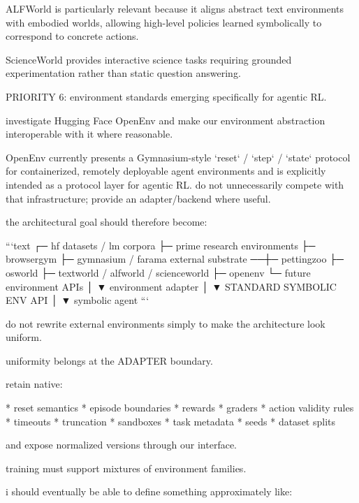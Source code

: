 ALFWorld is particularly relevant because it aligns abstract text environments with embodied worlds, allowing high-level policies learned symbolically to correspond to concrete actions.

ScienceWorld provides interactive science tasks requiring grounded experimentation rather than static question answering.

PRIORITY 6: environment standards emerging specifically for agentic RL.

investigate Hugging Face OpenEnv and make our environment abstraction interoperable with it where reasonable.

OpenEnv currently presents a Gymnasium-style `reset` / `step` / `state` protocol for containerized, remotely deployable agent environments and is explicitly intended as a protocol layer for agentic RL. do not unnecessarily compete with that infrastructure; provide an adapter/backend where useful.

the architectural goal should therefore become:

```text
                     ┌─ hf datasets / lm corpora
                     ├─ prime research environments
                     ├─ browsergym
                     ├─ gymnasium / farama
external substrate ──┼─ pettingzoo
                     ├─ osworld
                     ├─ textworld / alfworld / scienceworld
                     ├─ openenv
                     └─ future environment APIs
                              │
                              ▼
                    environment adapter
                              │
                              ▼
                  STANDARD SYMBOLIC ENV API
                              │
                              ▼
                       symbolic agent
```

do not rewrite external environments simply to make the architecture look uniform.

uniformity belongs at the ADAPTER boundary.

retain native:

* reset semantics
* episode boundaries
* rewards
* graders
* action validity rules
* timeouts
* truncation
* sandboxes
* task metadata
* seeds
* dataset splits

and expose normalized versions through our interface.

training must support mixtures of environment families.

i should eventually be able to define something approximately like:

